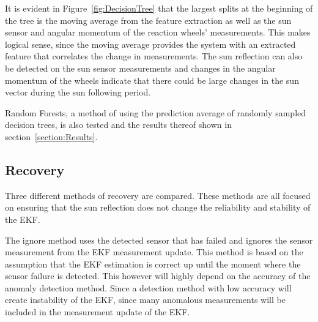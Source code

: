 \documentclass[letterpaper, 10 pt, conference]{ieeeconf}  %
\begin{document}
It is evident in Figure~\ref{fig:DecisionTree} that the largest splits at the beginning of the tree is the moving average from the feature extraction as well as the sun sensor and angular momentum of the reaction wheels' measurements. This makes logical sense, since the moving average provides the system with an extracted feature that correlates the change in measurements. The sun reflection can also be detected on the sun sensor measurements and changes in the angular momentum of the wheels indicate that there could be large changes in the sun vector during the sun following period.

Random Forests, a method of using the prediction average of randomly sampled decision trees, is also tested and the results thereof shown in section~\ref{section:Results}.


\subsection{Recovery}
Three different methods of recovery are compared. These methods are all focused on ensuring that the sun reflection does not change the reliability and stability of the EKF.

The ignore method uses the detected sensor that has failed and ignores the sensor measurement from the EKF measurement update. This method is based on the assumption that the EKF estimation is correct up until the moment where the sensor failure is detected. This however will highly depend on the accuracy of the anomaly detection method. Since a detection method with low accuracy will create instability of the EKF, since many anomalous measurements will be included in the measurement update of the EKF.

\end{document}
